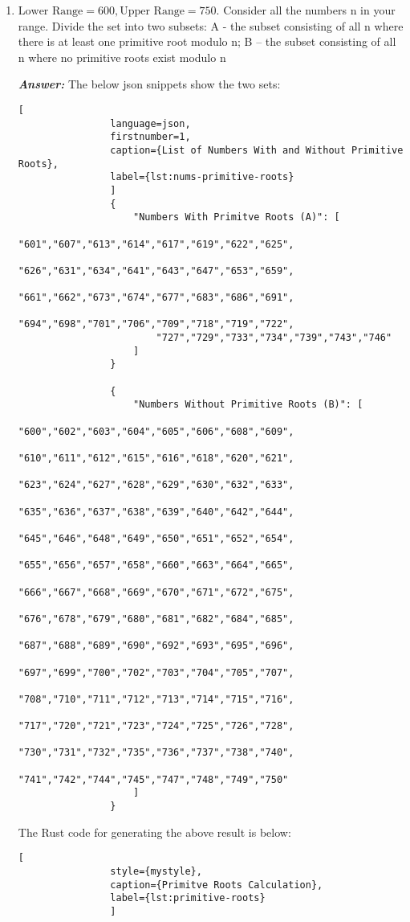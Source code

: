 \documentclass[11pt,a4paper,fleqn]{article}
\begin{document}
	\begin{enumerate}[1.]
		\item $\text{Lower Range} = 600, \text{Upper Range} = 750$. Consider all the numbers n in your range. Divide the set into two subsets:
		A - the subset consisting of all n where there is at least one primitive root modulo n; B – the subset consisting of all n where no primitive roots exist modulo n
		\bigskip
		\begin{flushleft}
			\textbf{\textit{Answer:}} The below json snippets show the two sets:
			\begin{lstlisting}[
				language=json,
				firstnumber=1,
				caption={List of Numbers With and Without Primitive Roots},
				label={lst:nums-primitive-roots}
				]
				{
					"Numbers With Primitve Roots (A)": [
						"601","607","613","614","617","619","622","625",
						"626","631","634","641","643","647","653","659",
						"661","662","673","674","677","683","686","691",
						"694","698","701","706","709","718","719","722",
						"727","729","733","734","739","743","746"
					]
				}

				{
					"Numbers Without Primitive Roots (B)": [
						"600","602","603","604","605","606","608","609",
						"610","611","612","615","616","618","620","621",
						"623","624","627","628","629","630","632","633",
						"635","636","637","638","639","640","642","644",
						"645","646","648","649","650","651","652","654",
						"655","656","657","658","660","663","664","665",
						"666","667","668","669","670","671","672","675",
						"676","678","679","680","681","682","684","685",
						"687","688","689","690","692","693","695","696",
						"697","699","700","702","703","704","705","707",
						"708","710","711","712","713","714","715","716",
						"717","720","721","723","724","725","726","728",
						"730","731","732","735","736","737","738","740",
						"741","742","744","745","747","748","749","750"
					]
				}
			\end{lstlisting}

			The Rust code for generating the above result is below:
			\begin{lstlisting}[
				style={mystyle},
				caption={Primitve Roots Calculation},
				label={lst:primitive-roots}
				]


\end{lstlisting}
\end{flushleft}
\end{enumerate}
\end{document}
